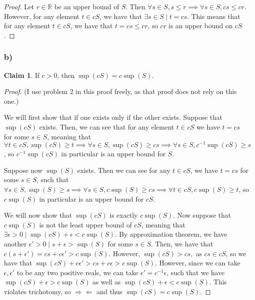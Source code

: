 \documentclass[12pt,letterpaper]{article}
\theoremstyle{definition}
\newtheorem*{claim}{Claim}
\newcommand{\contra}{\Rightarrow\!\Leftarrow}
\newcommand{\R}{\mathbb{R}}
\begin{document}
\begin{proof}
  Let $r \in \R$ be an upper bound of $S$. Then $\forall s \in S, s \leq r \implies
  \forall s \in S, cs \leq cr$. However, for any element $t \in cS$, we have that
  $\exists s \in S \mid t = cs$. This means that for any element $t \in cS$, we
  have that $t = cs \leq cr$, so $cr$ is an upper bound on $cS$.
\end{proof}

\subsubsection*{b)}

\begin{claim}
  If $c > 0$, then $\sup(cS) = c\sup(S)$.
\end{claim}

\begin{proof}
  (I use problem 2 in this proof freely, as that proof does not rely on this one.)

  We will first show that if one exists only if the other exists. Suppose that
  $\sup(cS)$ exists. Then, we can see that for any element
  $t \in cS$ we have $t = cs$ for some $s \in S$, meaning that $\forall t \in
  cS, \sup(cS) \geq t \implies \forall s \in S, \sup(cS) \geq cs \implies \forall s
  \in S, c^{-1}\sup(cS) \geq s$, so $c^{-1}\sup(cS)$ in particular is an upper
  bound for $S$.

  Suppose now $\sup(S)$ exists. Then we can see for any $t \in cS$, we have $t =
  cs$ for some $s \in S$, such that $\forall s \in S, \sup(S) \geq s \implies
  \forall s \in S, c\sup(S) \geq cs \implies \forall t \in cS, c\sup(S) \geq t$, so
  $c\sup(S)$ in particular is an upper bound for $cS$.

  We will now show that $\sup(cS)$ is exactly $c\sup(S)$.  Now suppose
  that $c\sup(S)$ is not the least upper bound of $cS$, meaning that
  $\exists \epsilon > 0 \mid \sup(cS) + \epsilon < c\sup(S)$. By
  approximation theorem, we have another $\epsilon' > 0 \mid s + \epsilon >
  \sup(S)$ for some $s \in S$. Then, we have that $c(s + \epsilon') = cs +
  c\epsilon' > c\sup(S)$. However, $\sup(cS) > cs,$ as $cs \in cS$, so we have
  that $\sup(cS) + c\epsilon' > cs + c\epsilon > c\sup(S)$. However, since we
  can take $\epsilon, \epsilon'$ to be any two positive reals, we can take $\epsilon'
  = c^{-1}\epsilon$, such that we have $\sup(cS) + \epsilon > c\sup(S)$ as well
  as $\sup(cS) + \epsilon < c\sup(S)$. This violates trichotomy, so $\contra$
  and thus $\sup(cS) = c\sup(S)$.
\end{proof}
\end{document}

